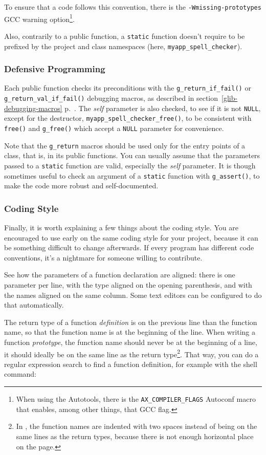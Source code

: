To ensure that a code follows this convention, there is the \texttt{-Wmissing-prototypes} GCC warning option\footnote{When using the Autotools, there is the \texttt{AX\_COMPILER\_FLAGS} Autoconf macro that enables, among other things, that GCC flag.}.

Also, contrarily to a public function, a \lstinline{static} function doesn't require to be prefixed by the project and class namespaces (here, \lstinline{myapp_spell_checker}).

\subsubsection{Defensive Programming}
Each public function checks its preconditions with the \lstinline{g_return_if_fail()} or \lstinline{g_return_val_if_fail()} debugging macros, as described in section~\ref{glib-debugging-macros} p.~\pageref{glib-debugging-macros}. The \emph{self} parameter is also checked, to see if it is not \lstinline{NULL}, except for the destructor, \lstinline{myapp_spell_checker_free()}, to be consistent with \lstinline{free()} and \lstinline{g_free()} which accept a \lstinline{NULL} parameter for convenience.

Note that the \lstinline{g_return} macros should be used only for the entry points of a class, that is, in its public functions. You can usually assume that the parameters passed to a \lstinline{static} function are valid, especially the \emph{self} parameter. It is though sometimes useful to check an argument of a \lstinline{static} function with \lstinline{g_assert()}, to make the code more robust and self-documented.

\subsubsection{Coding Style}

Finally, it is worth explaining a few things about the coding style. You are encouraged to use early on the same coding style for your project, because it can be something difficult to change afterwards. If every program has different code conventions, it's a nightmare for someone willing to contribute.

See how the parameters of a function declaration are aligned: there is one parameter per line, with the type aligned on the opening parenthesis, and with the names aligned on the same column. Some text editors can be configured to do that automatically.

The return type of a function \emph{definition} is on the previous line than the function name, so that the function name is at the beginning of the line. When writing a function \emph{prototype}, the function name should never be at the beginning of a line, it should ideally be on the same line as the return type\footnote{In , the function names are indented with two spaces instead of being on the same lines as the return types, because there is not enough horizontal place on the page.}. That way, you can do a regular expression search to find a function definition, for example with the  shell command:

